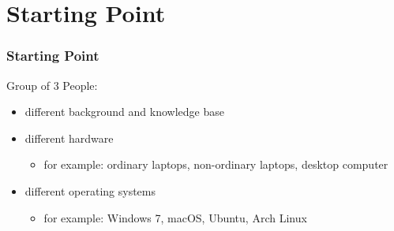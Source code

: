 \documentclass[aspectratio=169]{beamer}
\begin{document}
  \section{Starting Point} %
  \label{sec:starting_point}
  \begin{frame}
    \frametitle{Starting Point}
    Group of 3 People:
    \begin{itemize}
    \setlength\itemsep{1.5em}
      \item different background and knowledge base
      \item different hardware
      \begin{itemize}
        \item for example: ordinary laptops, non-ordinary laptops, desktop computer
      \end{itemize}
      \item different operating systems
      \begin{itemize}
        \item for example: Windows 7, macOS, Ubuntu, Arch Linux
      \end{itemize}
    \end{itemize}
  \end{frame}
\end{document}
